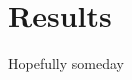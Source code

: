 \documentclass[12pt,a4paper]{article}
\begin{document}
\section{Results}
Hopefully someday



\end{document}
